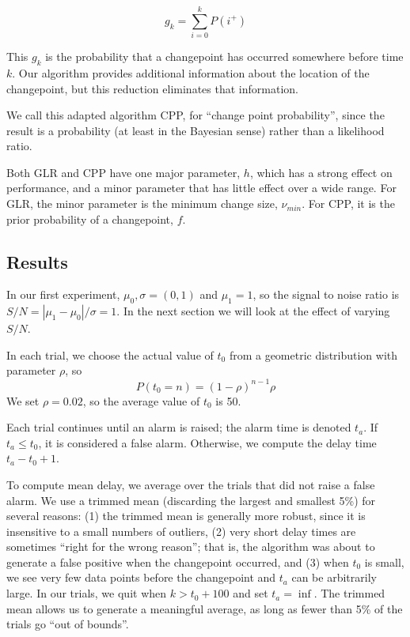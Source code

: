 \documentclass[twocolumn,11pt]{article}
\begin{document}
\begin{equation}
g_k = \sum_{i=0}^{k} P(i^+)
\end{equation}

This $g_k$ is the probability that a changepoint has
occurred somewhere before time $k$.  Our algorithm provides additional
information about the location of the changepoint, but this reduction
eliminates that information.

We call this adapted algorithm CPP, for ``change point probability'',
since the result is a probability (at least in the Bayesian sense)
rather than a likelihood ratio.

Both GLR and CPP have one major parameter, $h$, which has a strong
effect on performance, and a minor parameter that has little effect
over a wide range.  For GLR, the minor parameter is the minimum change
size, $\nu_{min}$.  For CPP, it is the prior probability of a
changepoint, $f$.


\subsection{Results}

In our first experiment, $\mu_0, \sigma = (0, 1)$ and $\mu_1 = 1$, so
the signal to noise ratio is $S/N = |\mu_1 - \mu_0| / \sigma = 1$.  In
the next section we will look at the effect of varying $S/N$.

In each trial, we choose the actual value of $t_0$ from a
geometric distribution with parameter $\rho$, so
%
\begin{equation}
P(t_0 = n) = (1 - \rho)^{n-1} \rho
\end{equation}
%
We set $\rho = 0.02$, so the average value of $t_0$ is 50.

Each trial continues until an alarm is raised; the alarm time is
denoted $t_a$.  If $t_a \le t_0$, it is considered a false alarm.
Otherwise, we compute the delay time $t_a - t_0 + 1$.

To compute mean delay, we average over the trials that did not raise a
false alarm.  We use a trimmed mean (discarding the largest and
smallest 5\%) for several reasons: (1) the trimmed mean is generally
more robust, since it is insensitive to a small numbers of outliers, (2)
very short delay times are sometimes ``right for the wrong reason'';
that is, the algorithm was about to generate a false
positive when the changepoint occurred, and (3) when $t_0$ is small,
we see very few data points before the changepoint and $t_a$ can be
arbitrarily large.  In our trials, we quit when $k > t_0 + 100$ and
set $t_a = \inf$.  The trimmed mean allows us to generate a
meaningful average, as long as fewer than 5\% of the trials go ``out
of bounds''.
\end{document}

